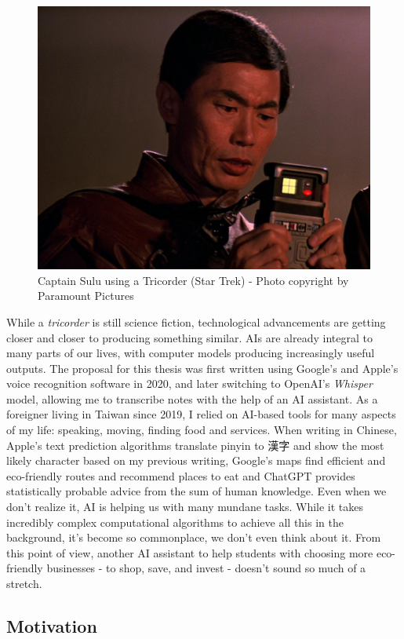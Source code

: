 \documentclass[
  letterpaper,
  DIV=11,
  numbers=noendperiod]{scrartcl}
\begin{document}
\begin{figure}[H]

{\centering \includegraphics[width=0.5\linewidth,height=\textheight,keepaspectratio]{./images/introduction/tricorder.jpg}

}

\caption{Captain Sulu using a Tricorder (Star Trek) - Photo copyright by
Paramount Pictures}

\end{figure}%

While a \emph{tricorder} is still science fiction, technological
advancements are getting closer and closer to producing something
similar. AIs are already integral to many parts of our lives, with
computer models producing increasingly useful outputs. The proposal for
this thesis was first written using Google's and Apple's voice
recognition software in 2020, and later switching to OpenAI's
\emph{Whisper} model, allowing me to transcribe notes with the help of
an AI assistant. As a foreigner living in Taiwan since 2019, I relied on
AI-based tools for many aspects of my life: speaking, moving, finding
food and services. When writing in Chinese, Apple's text prediction
algorithms translate pinyin to 漢字 and show the most likely character
based on my previous writing, Google's maps find efficient and
eco-friendly routes and recommend places to eat and ChatGPT provides
statistically probable advice from the sum of human knowledge. Even when
we don't realize it, AI is helping us with many mundane tasks. While it
takes incredibly complex computational algorithms to achieve all this in
the background, it's become so commonplace, we don't even think about
it. From this point of view, another AI assistant to help students with
choosing more eco-friendly businesses - to shop, save, and invest -
doesn't sound so much of a stretch.

\subsection{Motivation}\label{motivation}
\end{document}

